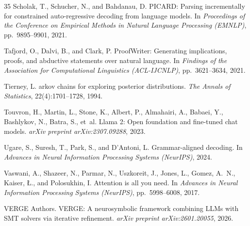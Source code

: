 \documentclass[twoside,11pt]{article}
\begin{document}
\begin{thebibliography}{35}
Scholak, T., Schucher, N., and Bahdanau, D.
\newblock PICARD: Parsing incrementally for constrained auto-regressive
decoding from language models.
\newblock In \emph{Proceedings of the Conference on Empirical Methods in
Natural Language Processing (EMNLP)}, pp.\ 9895--9901, 2021.

Tafjord, O., Dalvi, B., and Clark, P.
\newblock ProofWriter: Generating implications, proofs, and abductive
statements over natural language.
\newblock In \emph{Findings of the Association for Computational Linguistics
(ACL-IJCNLP)}, pp.\ 3621--3634, 2021.

Tierney, L.
arkov chains for exploring posterior distributions.
\newblock \emph{The Annals of Statistics}, 22(4):1701--1728, 1994.

Touvron, H., Martin, L., Stone, K., Albert, P., Almahairi, A., Babaei, Y.,
Bashlykov, N., Batra, S., et~al.
\newblock Llama 2: Open foundation and fine-tuned chat models.
\newblock \emph{arXiv preprint arXiv:2307.09288}, 2023.

Ugare, S., Suresh, T., Park, S., and D'Antoni, L.
\newblock Grammar-aligned decoding.
\newblock In \emph{Advances in Neural Information Processing Systems
(NeurIPS)}, 2024.

Vaswani, A., Shazeer, N., Parmar, N., Uszkoreit, J., Jones, L., Gomez,
A.~N., Kaiser, {\L}., and Polosukhin, I.
\newblock Attention is all you need.
\newblock In \emph{Advances in Neural Information Processing Systems
(NeurIPS)}, pp.\ 5998--6008, 2017.

{VERGE Authors}.
\newblock VERGE: A neurosymbolic framework combining LLMs with SMT solvers
via iterative refinement.
\newblock \emph{arXiv preprint arXiv:2601.20055}, 2026.


\end{thebibliography}
\end{document}
